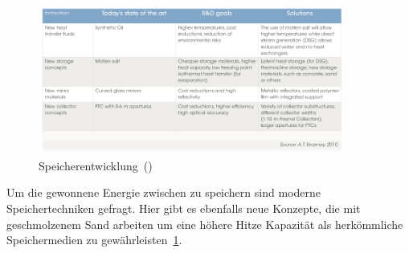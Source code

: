 \begin{figure}[H]
	\centering
	\includegraphics[width=0.9\textwidth,trim=1 1 1 1,clip]{technische_entwicklung2.png}
	\caption{Speicherentwicklung~(\cite{irena2012})}
	\label{fig:technik_e2}
\end{figure}

Um die gewonnene Energie zwischen zu speichern sind moderne Speichertechniken gefragt. Hier gibt es ebenfalls neue Konzepte, die mit geschmolzenem Sand arbeiten um eine höhere Hitze Kapazität als herkömmliche Speichermedien zu gewährleisten~\ref{fig:technik_e2}.


